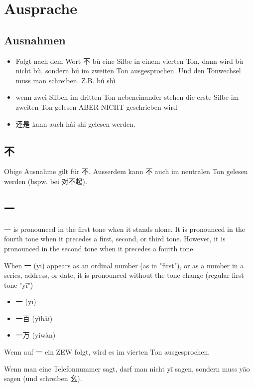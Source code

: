 \documentclass[UTF8]{ctexart}
\begin{document}
\section{Ausprache}

\subsection{Ausnahmen}

\begin{itemize}
    \item Folgt nach dem Wort 不 bù eine Silbe in einem vierten Ton, dann wird bù nicht bù,
    sondern bú im zweiten Ton ausgesprochen. Und den Tonwechsel muss man
    schreiben. Z.B. bú shì
    \item wenn zwei Silben im dritten Ton nebeneinander stehen die erste Silbe im zweiten
    Ton gelesen ABER NICHT geschrieben wird
    \item 还是 kann auch hái shi gelesen werden.
\end{itemize}


\subsection{不}

Obige Ausnahme gilt für 不. Ausserdem kann 不 auch im neutralen Ton gelesen werden (bspw. bei 对不起).

\subsection{一}

一 is pronounced in the first tone when it stands alone. It is pronounced in the fourth tone when it precedes a first, second, or third tone. However, it is pronounced in the second tone when it precedes a fourth tone.

When 一 (yī) appears as an ordinal number (as in "first"), or as a number in a series, address, or date, it is pronounced without the tone change (regular first tone "yī")

\begin{itemize}
    \item 一 (yī)
    \item 一百 (yìbǎi)
    \item 一万 (yíwàn)
\end{itemize}

Wenn auf 一 ein ZEW folgt, wird es im vierten Ton ausgesprochen.

Wenn man eine Telefonnummer sagt, darf man nicht yī sagen, sondern muss yāo sagen (und schreiben 幺).
\end{document}
